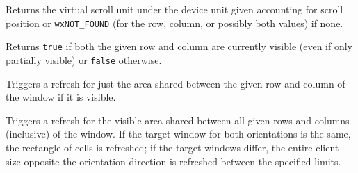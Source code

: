 \label{wxvarhvscrollhelpervirtualhittest}



Returns the virtual scroll unit under the device unit given accounting for
scroll position or {\tt wxNOT\_FOUND} (for the row, column, or possibly both
values) if none.


\label{wxvarhvscrollhelperisvisible}



Returns {\tt true} if both the given row and column are currently visible
(even if only partially visible) or {\tt false} otherwise.


\label{wxvarhvscrollhelperrefreshrowcolumn}



Triggers a refresh for just the area shared between the given row and column
of the window if it is visible.


\label{wxvarhvscrollhelperrefreshrowscolumns}



Triggers a refresh for the visible area shared between all given rows and
columns (inclusive) of the window. If the target window for both orientations
is the same, the rectangle of cells is refreshed; if the target windows
differ, the entire client size opposite the orientation direction is
refreshed between the specified limits.


\label{wxvarhvscrollhelperscrolltorowcolumn}

